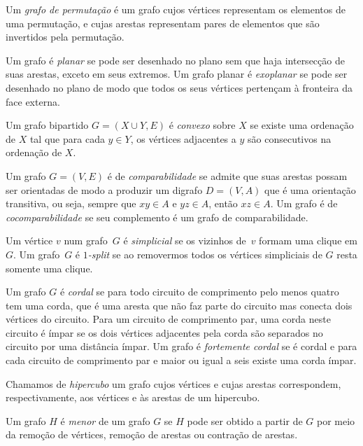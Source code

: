 Um \emph{grafo de permutação} é um grafo cujos vértices representam os elementos de uma permutação, e cujas arestas representam pares de elementos que são invertidos pela permutação. 



Um grafo é \emph{planar} se pode ser desenhado no plano sem que haja intersecção de suas arestas, exceto em seus extremos.  Um grafo planar é \emph{exoplanar} se pode ser desenhado no plano de modo que todos os seus vértices pertençam à  fronteira da face externa.

Um grafo bipartido $G=(X \cup Y, E)$ é \emph{convexo} sobre $X$ se
existe uma ordenação de $X$ tal que para cada $y \in Y$, os vértices
adjacentes a $y$ são consecutivos na ordenação de $X$.

Um grafo $G=(V,E)$ é de \emph{comparabilidade} se admite que suas arestas possam ser orientadas de modo a produzir um digrafo $D=(V,A)$ que é uma orientação transitiva,  ou seja, sempre que  $xy\in A$ e $yz \in A$, então $xz \in A$. Um grafo é de \emph{cocomparabilidade} se seu complemento é um grafo de comparabilidade.

Um vértice $v$ num grafo~$G$ é \emph{simplicial} se os vizinhos de~$v$ formam uma clique em $G$. Um grafo~$G$ é \emph{$1$-split} se ao removermos todos os vértices simpliciais de $G$ resta somente uma clique.

Um grafo $G$ é \emph{cordal} se para todo circuito de comprimento pelo menos quatro tem uma corda, que é uma aresta que 
não faz parte do circuito mas conecta dois vértices do circuito. Para um circuito de comprimento par, uma corda neste circuito é ímpar se os dois vértices adjacentes pela corda são separados no circuito por uma distância ímpar. Um grafo é \emph{fortemente cordal} se é cordal e para cada circuito de comprimento par e maior ou igual a seis  existe uma corda ímpar.

Chamamos de \emph{hipercubo} um grafo cujos vértices e cujas arestas correspondem, respectivamente, aos vértices e às arestas de um hipercubo.

Um grafo $H$ é \emph{menor} de um grafo $G$ se $H$ pode ser obtido a partir de
$G$ por meio da remoção de vértices, remoção de arestas ou contração de arestas.

